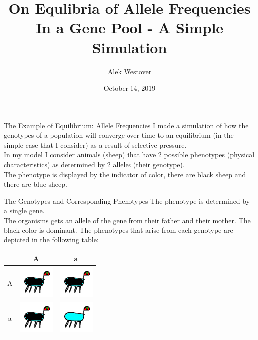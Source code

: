 \documentclass[xcolor=x11names, svgnames, rgb]{beamer}
\title{On Equlibria of Allele Frequencies In a Gene Pool - A Simple Simulation }
\author{Alek Westover}
\institute{AP Chemistry}
\date{October 14, 2019}
\begin{document}
 
\frame{\titlepage}

\begin{frame}[t]{The Example of Equilibrium: Allele Frequencies}
	I made a simulation	of how the genotypes of a population will converge over time to an equilibrium (in the simple case that I consider) as a result of selective pressure.\\
	\vspace{0.5cm}
	In my model I consider animals (sheep) that have 2 possible phenotypes (physical characteristics) as determined by 2 alleles (their genotype).\\
	\vspace{0.5cm}
	The phenotype is displayed by the indicator of color, there are black sheep and there are blue sheep.\\

\end{frame}

\begin{frame}[t]{The Genotypes and Corresponding Phenotypes}
	The phenotype is determined by a single gene.\\
	 The organisms gets an allele of the gene from their father and their mother. The black color is dominant. The phenotypes that arise from each genotype are depicted in the following table:
	\begin{center}
	\begin{tabular}{ c | c | c }
	  & A & a \\ 
		\hline
		A & \includegraphics[width=0.15\linewidth]{dogBlack.png} & \includegraphics[width=0.15\linewidth]{dogBlack.png} \\  
		\hline
		a & \includegraphics[width=0.15\linewidth]{dogBlack.png} & \includegraphics[width=0.15\linewidth]{dogBlue.png} 
	\end{tabular}
	\end{center}
\end{frame}
\end{document}
